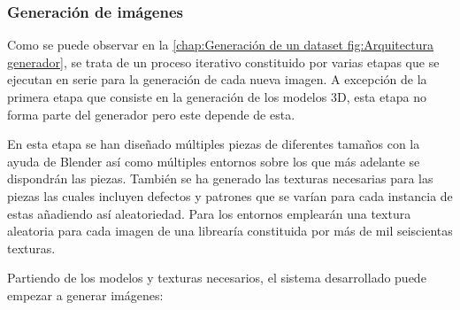 \subsubsection*{Generación de imágenes}
\label{chap:Generación de un dataset subsec:Generación de imágenes}
Como se puede observar en la \autoref{chap:Generación de un dataset fig:Arquitectura generador}, se trata de un proceso iterativo constituido por varias etapas que se ejecutan en serie para la generación de cada nueva imagen. A excepción de la primera etapa que consiste en la generación de los modelos 3D, esta etapa no forma parte del generador pero este depende de esta.

En esta etapa se han diseñado múltiples piezas de diferentes tamaños con la ayuda de Blender así como múltiples entornos sobre los que más adelante se dispondrán las piezas. También se ha generado las texturas necesarias para las piezas las cuales incluyen defectos y patrones que se varían para cada instancia de estas añadiendo así aleatoriedad. Para los entornos emplearán una textura aleatoria para cada imagen de una librearía constituida por más de mil seiscientas texturas.

Partiendo de los modelos y texturas necesarios, el sistema desarrollado puede empezar a generar imágenes:

